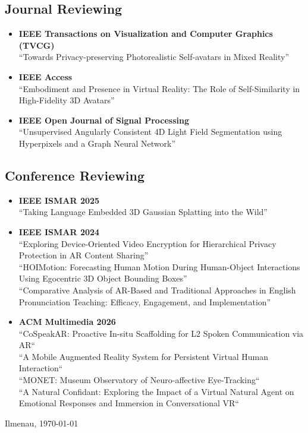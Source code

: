 \documentclass[11pt,a4paper]{article}
\begin{document}
\subsection*{Journal Reviewing}

\begin{itemize}[nosep, leftmargin=1.5em, itemsep=3pt]
  \item \textbf{IEEE Transactions on Visualization and Computer Graphics (TVCG)}\\
    ``Towards Privacy-preserving Photorealistic Self-avatars in Mixed Reality''
  \item \textbf{IEEE Access}\\
    ``Embodiment and Presence in Virtual Reality: The Role of Self-Similarity
     in High-Fidelity 3D Avatars''
  \item \textbf{IEEE Open Journal of Signal Processing}\\
    ``Unsupervised Angularly Consistent 4D Light Field Segmentation using
     Hyperpixels and a Graph Neural Network''
\end{itemize}

\subsection*{Conference Reviewing}

\begin{itemize}[nosep, leftmargin=1.5em, itemsep=3pt]
  \item \textbf{IEEE ISMAR 2025}\\
    ``Taking Language Embedded 3D Gaussian Splatting into the Wild''
  \item \textbf{IEEE ISMAR 2024}\\
    ``Exploring Device-Oriented Video Encryption for Hierarchical
     Privacy Protection in AR Content Sharing''\\
    ``HOIMotion: Forecasting Human Motion During Human-Object Interactions
     Using Egocentric 3D Object Bounding Boxes''\\
    ``Comparative Analysis of AR-Based and Traditional Approaches in
     English Pronunciation Teaching: Efficacy, Engagement, and Implementation''
  \item \textbf{ACM Multimedia 2026}\\
  ``CoSpeakAR: Proactive In-situ Scaffolding for L2 Spoken Communication via AR``\\
  ``A Mobile Augmented Reality System for Persistent Virtual Human Interaction``\\
  ``MONET: Museum Observatory of Neuro-affective Eye-Tracking``\\
  ``A Natural Confidant: Exploring the Impact of a Virtual Natural Agent on Emotional Responses and Immersion in Conversational VR``
  	
\end{itemize}


\vfill
\begin{flushright}
  \small Ilmenau, \today
\end{flushright}
\end{document}
